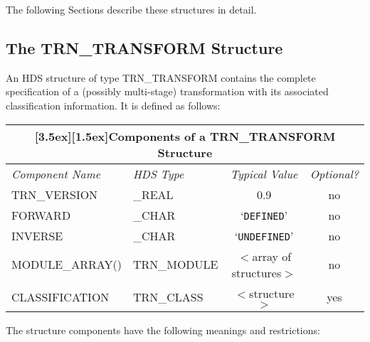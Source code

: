 \documentclass[twoside,11pt]{article}
\newcommand{\xlabel}[1]{}
\newcommand{\name}[1]{\mbox{\small{#1}}}
\begin{document}
The following Sections describe these structures in detail.

\subsection{\xlabel{the_nametrn_transform_structure}The \name{TRN\_TRANSFORM} Structure}

An \name{HDS} structure of type \name{TRN\_TRANSFORM} contains the complete
specification of a (possibly multi-stage) transformation with its associated
classification information.
It is defined as follows: 

\begin{center}

\begin{tabular}{|llc|c|}
\hline
\multicolumn{4}{|c|}{\raisebox{0ex}[3.5ex][1.5ex]{\bf Components of a
\name{TRN\_TRANSFORM} Structure}} \\ 
\hline
\hline
{\em Component Name} & {\em \name{HDS} Type} & {\em Typical Value} & {\em
Optional?} \\ 
\hline
TRN\_VERSION & \_REAL & 0.9 & no \\
FORWARD & \_CHAR & `\verb#DEFINED#' & no \\
INVERSE & \_CHAR & `\verb#UNDEFINED#' & no \\
MODULE\_ARRAY() & TRN\_MODULE & $<$array of structures$>$ & no \\
CLASSIFICATION & TRN\_CLASS & $<$structure$>$ & yes \\
\hline
\end{tabular}

\end{center}

The structure components have the following meanings and restrictions:
\end{document}
